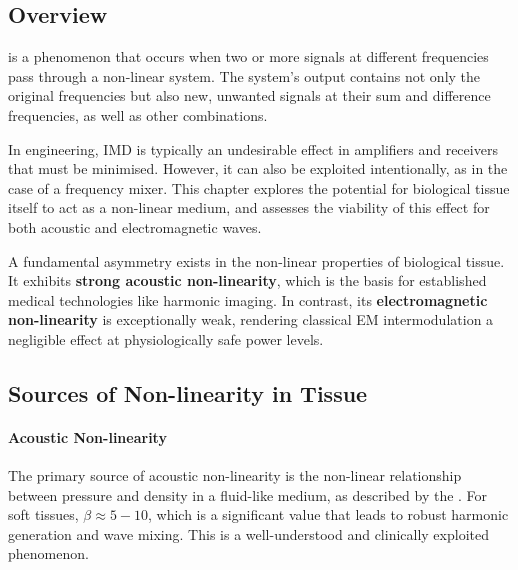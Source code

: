\subsection{Overview}

 is a phenomenon that occurs when two or more signals at different frequencies pass through a non-linear system. The system's output contains not only the original frequencies but also new, unwanted signals at their sum and difference frequencies, as well as other combinations.

In engineering, IMD is typically an undesirable effect in amplifiers and receivers that must be minimised. However, it can also be exploited intentionally, as in the case of a frequency mixer. This chapter explores the potential for biological tissue itself to act as a non-linear medium, and assesses the viability of this effect for both acoustic and electromagnetic waves.

\begin{keyconcept}
    A fundamental asymmetry exists in the non-linear properties of biological tissue. It exhibits \textbf{strong acoustic non-linearity}, which is the basis for established medical technologies like harmonic imaging. In contrast, its \textbf{electromagnetic non-linearity} is exceptionally weak, rendering classical EM intermodulation a negligible effect at physiologically safe power levels.
\end{keyconcept}


\subsection{Sources of Non-linearity in Tissue}

\paragraph{Acoustic Non-linearity}
The primary source of acoustic non-linearity is the non-linear relationship between pressure and density in a fluid-like medium, as described by the . For soft tissues, $\beta \approx 5-10$, which is a significant value that leads to robust harmonic generation and wave mixing. This is a well-understood and clinically exploited phenomenon.

